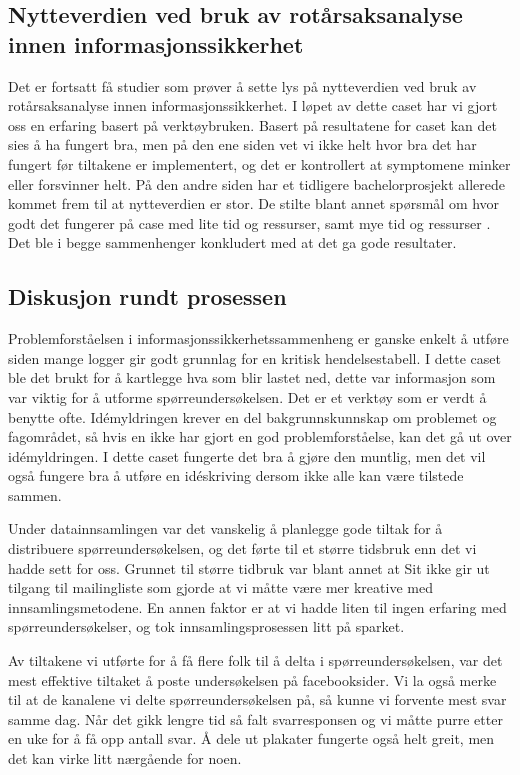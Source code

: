 \subsection*{Nytteverdien ved bruk av rotårsaksanalyse innen informasjonssikkerhet}
Det er fortsatt få studier som prøver å sette lys på nytteverdien ved bruk av rotårsaksanalyse innen informasjonssikkerhet. I løpet av dette caset har vi gjort oss en erfaring basert på verktøybruken. Basert på resultatene for caset kan det sies å ha fungert bra, men på den ene siden vet vi ikke helt hvor bra det har fungert før tiltakene er implementert, og det er kontrollert at symptomene minker eller forsvinner helt. På den andre siden har et tidligere bachelorprosjekt allerede kommet frem til at nytteverdien er stor. De stilte blant annet spørsmål om hvor godt det fungerer på case med lite tid og ressurser, samt mye tid og ressurser \cite{RCARapport}. Det ble i begge sammenhenger konkludert med at det ga gode resultater. 

\subsection{Diskusjon rundt prosessen}
Problemforståelsen i informasjonssikkerhetssammenheng er ganske enkelt å utføre siden mange logger gir godt grunnlag for en kritisk hendelsestabell. I dette caset ble det brukt for å kartlegge hva som blir lastet ned, dette var informasjon som var viktig for å utforme spørreundersøkelsen. Det er et verktøy som er verdt å benytte ofte. Idémyldringen krever en del bakgrunnskunnskap om problemet og fagområdet, så hvis en ikke har gjort en god problemforståelse, kan det gå ut over idémyldringen. I dette caset fungerte det bra å gjøre den muntlig, men det vil også fungere bra å utføre en idéskriving dersom ikke alle kan være tilstede sammen. 

Under datainnsamlingen var det vanskelig å planlegge gode tiltak for å distribuere spørreundersøkelsen, og det førte til et større tidsbruk enn det vi hadde sett for oss. Grunnet til større tidbruk var blant annet at Sit ikke gir ut tilgang til mailingliste som gjorde at vi måtte være mer kreative med innsamlingsmetodene. En annen faktor er at vi hadde liten til ingen erfaring med spørreundersøkelser, og tok innsamlingsprosessen litt på sparket. 

Av tiltakene vi utførte for å få flere folk til å delta i spørreundersøkelsen, var det mest effektive tiltaket å poste undersøkelsen på facebooksider. Vi la også merke til at de kanalene vi delte spørreundersøkelsen på, så kunne vi forvente mest svar samme dag. Når det gikk lengre tid så falt svarresponsen og vi måtte purre etter en uke for å få opp antall svar. Å dele ut plakater fungerte også helt greit, men det kan virke litt nærgående for noen. 

